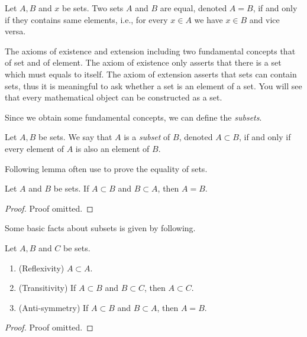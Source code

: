 \begin{axiom}
    Let $A, B$ and $x$ be sets. Two sets $A$ and $B$ are equal, denoted $A = B$, if and only if they contains same elements, i.e., for every $x \in A$ we have $x \in B$ and vice versa.
\end{axiom}

The axioms of existence and extension including two fundamental concepts that of set and of element. The axiom of existence only asserts that there is a set which must equals to itself. The axiom of extension asserts that sets can contain sets, thus it is meaningful to ask whether a set is an element of a set. You will see that every mathematical object can be constructed as a set.

Since we obtain some fundamental concepts, we can define the \emph{subsets}.

\begin{definition}[Subsets]
    Let $A, B$ be sets. We say that $A$ is a \emph{subset} of $B$, denoted $A \subset B$, if and only if every element of $A$ is also an element of $B$.
\end{definition}

Following lemma often use to prove the equality of sets.

\begin{lemma}
    Let $A$ and $B$ be sets. If $A \subset B$ and $B \subset A$, then $A = B$.
\end{lemma}

\begin{proof}
    Proof omitted.
\end{proof}

Some basic facts about subsets is given by following.

\begin{proposition}
    Let $A, B$ and $C$ be sets.
    \begin{enumerate}
        \item (Reflexivity) $A \subset A$.
        \item (Transitivity) If $A \subset B$ and $B \subset C$, then $A \subset C$.
        \item (Anti-symmetry) If $A \subset B$ and $B \subset A$, then $A = B$.
    \end{enumerate}
\end{proposition}

\begin{proof}
    Proof omitted.
\end{proof}

